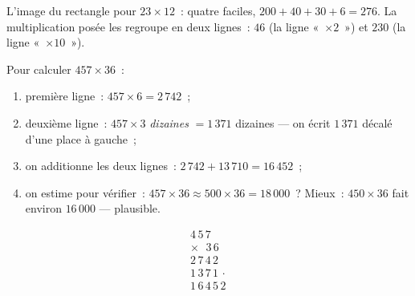 \begin{omfigure}

{\small L'image du rectangle pour $23 \times 12$~: quatre 
faciles, $200 + 40 + 30 + 6 = 276$. La multiplication posée les
regroupe en deux lignes~: $46$ (la ligne «~$\times 2$~») et $230$
(la ligne «~$\times 10$~»).}
\end{omfigure}

\begin{method}\label{met:g4:mult:column}
Pour calculer $457 \times 36$~:
\begin{enumerate}
  \item première ligne~: $457 \times 6 = 2\,742$~;
  \item deuxième ligne~: $457 \times 3$ \emph{dizaines} $= 1\,371$
        dizaines --- on écrit $1\,371$ décalé d'une place à gauche~;
  \item on additionne les deux lignes~:
        $2\,742 + 13\,710 = 16\,452$~;
  \item on estime pour vérifier~: $457 \times 36 \approx 500 \times 36
        = 18\,000$~? Mieux~: $450 \times 36$ fait environ $16\,000$ ---
        plausible.
\end{enumerate}
\[
\begin{array}{r}
4\,5\,7 \\
\times\ \ \,3\,6 \\
\hline
2\,7\,4\,2 \\
1\,3\,7\,1\,\cdot \\
\hline
1\,6\,4\,5\,2
\end{array}
\]
\end{method}

